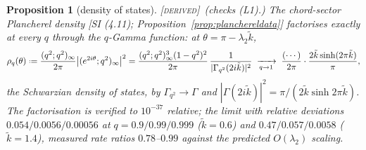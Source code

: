 \documentclass[11pt,a4paper]{article}
\providecommand{\coloneqq}{\mathrel{\vcenter{\baselineskip0.5ex \lineskiplimit0pt
      \hbox{\scriptsize.}\hbox{\scriptsize.}}}=}
\newcommand{\DERIVED}{{\color{teal}\textsc{[derived]}}}
\theoremstyle{definition}
\theoremstyle{plain}
\newtheorem{proposition}[definition]{Proposition}
\begin{document}
\begin{proposition}[density of states]\label{prop:dos}
\DERIVED\ (checks (L1).) The chord-sector Plancherel density [SI (4.11);
Proposition~\ref{prop:planchereldata}] factorises \emph{exactly} at every $q$ through the
$q$-Gamma function: at $\theta=\pi-\lambda_2\tilde k$,
\begin{equation}\label{eq:dosfactorised}
  \rho_{q}(\theta)\coloneqq\frac{(q^{2};q^{2})_{\infty}}{2\pi}
  \bigl|(e^{2i\theta};q^{2})_{\infty}\bigr|^{2}
  =\frac{(q^{2};q^{2})_{\infty}^{3}(1-q^{2})^{2}}{2\pi}\,
  \frac{1}{|\Gamma_{q^{2}}(2i\tilde k)|^{2}}
  \;\xrightarrow[q\to1]{}\;
  \frac{(\cdots)}{2\pi}\cdot\frac{2\tilde k\sinh(2\pi\tilde k)}{\pi},
\end{equation}
the Schwarzian density of states, by $\Gamma_{q^{2}}\to\Gamma$ and
$|\Gamma(2i\tilde k)|^{2}=\pi/(2\tilde k\sinh2\pi\tilde k)$. The factorisation is verified
to $10^{-37}$ relative; the limit with relative deviations
$0.054/0.0056/0.00056$ at $q=0.9/0.99/0.999$ ($\tilde k=0.6$) and $0.47/0.057/0.0058$
($\tilde k=1.4$), measured rate ratios $0.78$--$0.99$ against the predicted $O(\lambda_2)$
scaling.
\end{proposition}
\end{document}
